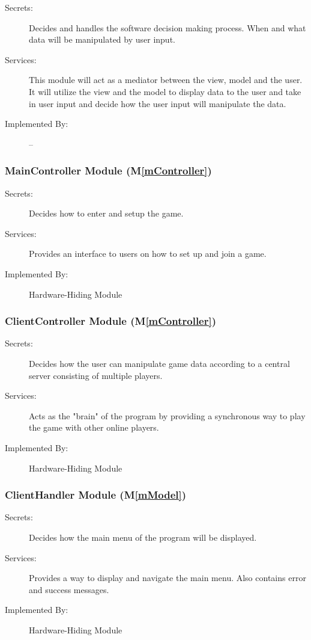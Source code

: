 \documentclass[12pt, titlepage]{article}
\newcommand{\mref}[1]{M\ref{#1}}
\begin{document}
\begin{description}
\item[Secrets:] Decides and handles the software decision making process. When and what data will be manipulated by user input.
\item[Services:] This module will act as a mediator between the view, model and the user. It will utilize the view and the model to display data to the user and take in user input and decide how the user input will manipulate the data. 
\item[Implemented By:] --
\end{description}

\subsubsection{ MainController Module (\mref{mController})}
    \begin{description}
    \item[Secrets:] Decides how to enter and setup the game.
    \item[Services:] Provides an interface to users on how to set up and join a game.
    \item[Implemented By:] Hardware-Hiding Module
    \end{description}

\subsubsection{ ClientController Module (\mref{mController})}
    \begin{description}
    \item[Secrets:] Decides how the user can manipulate game data according to a central server consisting of multiple players.
    \item[Services:] Acts as the "brain" of the program by providing a synchronous way to play the game with other online players. 
    \item[Implemented By:] Hardware-Hiding Module
    \end{description}

\subsubsection{ ClientHandler Module (\mref{mModel})}
    \begin{description}
    \item[Secrets:] Decides how the main menu of the program will be displayed.
    \item[Services:] Provides a way to display and navigate the main menu. Also contains error and success messages.
    \item[Implemented By:] Hardware-Hiding Module
    \end{description}
\end{document}
